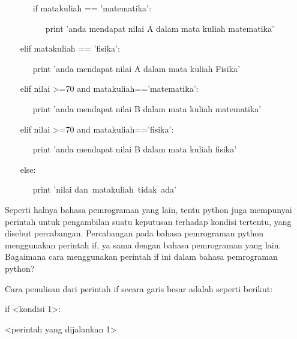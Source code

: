 \noindent 
~~~~~~ if matakuliah == 'matematika': \par
\vspace{12pt}
\noindent 
~~~~~~~~~ print 'anda mendapat nilai A dalam mata kuliah matematika' \par
\vspace{12pt}
\noindent 
~~~ elif matakuliah == 'fisika': \par
\vspace{12pt}
\noindent 
~~~~~~ print 'anda mendapat nilai A dalam mata kuliah Fisika' \par
\vspace{12pt}
\noindent 
~~~ elif nilai >=70 and matakuliah=='matematika': \par
\vspace{12pt}
\vspace{12pt}
\noindent 
~~~~~~ print 'anda mendapat nilai B dalam mata kuliah matematika' \par
\vspace{12pt}
\noindent 
~~~ elif nilai >=70 and matakuliah=='fisika': \par
\vspace{12pt}
\noindent 
~~~~~~ print 'anda mendapat nilai B dalam mata kuliah fisika' \par
\vspace{12pt}
\noindent 
~~~ else: \par
\vspace{12pt}
\noindent 
~~~~~~ print 'nilai dan~matakuliah~tidak~ada'~~~     \par
\vspace{12pt}
\noindent 
Seperti halnya bahasa pemrograman yang lain, tentu python juga mempunyai perintah untuk pengambilan suatu keputusan terhadap kondisi tertentu, yang disebut percabangan. Percabangan pada bahasa pemrograman python menggunakan perintah if, ya sama dengan bahasa pemrograman yang lain. Bagaimana cara menggunakan perintah if ini dalam bahasa pemrograman python? \par
\noindent 
\vspace{\baselineskip}
Cara penulisan dari perintah if secara garis besar adalah seperti berikut: \par
\noindent 
\vspace{\baselineskip}
\vspace{\baselineskip}
if <kondisi 1>: \par
\noindent 
\vspace{\baselineskip}
 $  $<perintah yang dijalankan 1> \par
